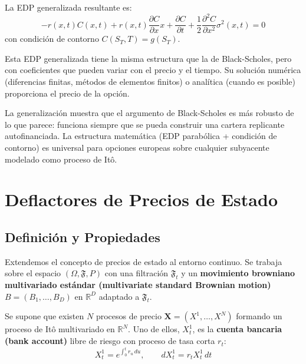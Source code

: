 \documentclass[12pt]{article}
\begin{document}
La EDP generalizada resultante es:
\begin{equation}
  -r(x,t)C(x,t) + r(x,t)\frac{\partial C}{\partial x}x + \frac{\partial C}{\partial t} + \frac{1}{2}\frac{\partial^2 C}{\partial x^2}\sigma^2(x,t) = 0
\end{equation}
con condici\'on de contorno $C(S_T, T) = g(S_T)$.

\begin{intuicionmat}
Esta EDP generalizada tiene la misma estructura que la de Black-Scholes, pero con coeficientes que pueden variar con el precio y el tiempo. Su soluci\'on num\'erica (diferencias finitas, m\'etodos de elementos finitos) o anal\'itica (cuando es posible) proporciona el precio de la opci\'on.
\end{intuicionmat}

\begin{intuicion}
La generalizaci\'on muestra que el argumento de Black-Scholes es m\'as robusto de lo que parece: funciona siempre que se pueda construir una cartera replicante autofinanciada. La estructura matem\'atica (EDP parab\'olica + condici\'on de contorno) es universal para opciones europeas sobre cualquier subyacente modelado como proceso de It\^o.
\end{intuicion}

\section{Deflactores de Precios de Estado}

\subsection{Definici\'on y Propiedades}

Extendemos el concepto de precios de estado al entorno continuo. Se trabaja sobre el espacio $(\Omega, \mathfrak{F}, P)$ con una filtraci\'on $\mathfrak{F}_t$ y un \textbf{movimiento browniano multivariado est\'andar (multivariate standard Brownian motion)} $B = (B_1, \ldots, B_D)$ en $\mathbb{R}^D$ adaptado a $\mathfrak{F}_t$.

Se supone que existen $N$ procesos de precio $\mathbf{X} = (X^1, \ldots, X^N)$ formando un proceso de It\^o multivariado en $\mathbb{R}^N$. Uno de ellos, $X_t^1$, es la \textbf{cuenta bancaria (bank account)} libre de riesgo con proceso de tasa corta $r_t$:
\begin{equation}
  X_t^1 = e^{\int_0^t r_u\,du}, \qquad dX_t^1 = r_t X_t^1 \, dt
\end{equation}
\end{document}
